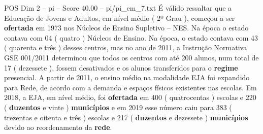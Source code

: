 \begin{textsample}{POS Dim 2 – pi – Score 40.00 – pi/pi\_em\_7.txt}
É válido ressaltar que a Educação de Jovens e Adultos, em nível médio ( 2º Grau ), começou a ser \textbf{ofertada} em 1973 nos Núcleos de Ensino Supletivo – NES.
Na época o estado contava com 04 ( quatro ) Núcleos de Ensino.
Na época, o estado contava com 43 ( quarenta e três ) desses centros, mas no ano de 2011, a Instrução Normativa GSE 001/2011 determinou que todos os centros com até 200 alunos, num total de 17 ( dezessete ), fossem desativados e os alunos transferidos para o \textbf{regime} presencial.
A partir de 2011, o ensino médio na modalidade EJA foi expandido para Rede, de acordo com a demanda e espaços físicos existentes nas escolas.
Em 2018, a EJA, em nível médio, foi \textbf{ofertada} em 400 ( quatrocentas ) escolas e 220 ( \textbf{duzentos} e vinte ) \textbf{municípios} e em 2019 esse número caiu para 383 ( trezentas e oitenta e três ) escolas e 217 ( \textbf{duzentos} e dezessete ) \textbf{municípios} devido ao reordenamento da \textbf{rede}.

\end{textsample}
